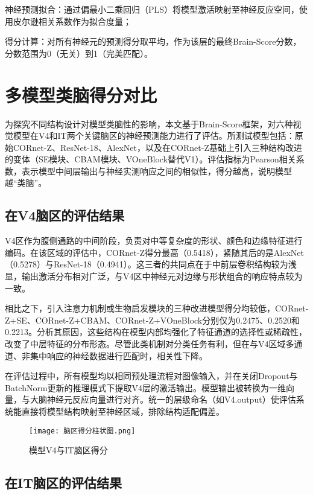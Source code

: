 神经预测拟合：通过偏最小二乘回归（PLS）将模型激活映射至神经反应空间，使用皮尔逊相关系数作为拟合度量；

得分计算：对所有神经元的预测得分取平均，作为该层的最终Brain-Score分数，分数范围为0（无关）到1（完美匹配）。

\section{多模型类脑得分对比}

为探究不同结构设计对模型类脑性的影响，本文基于Brain-Score框架，对六种视觉模型在V4和IT两个关键脑区的神经预测能力进行了评估。所测试模型包括：原始CORnet-Z、ResNet-18、AlexNet，以及在CORnet-Z基础上引入三种结构改进的变体（SE模块、CBAM模块、VOneBlock替代V1）。评估指标为Pearson相关系数，表示模型中间层输出与神经实测响应之间的相似性，得分越高，说明模型越“类脑”。

\subsection{在V4脑区的评估结果}

V4区作为腹侧通路的中间阶段，负责对中等复杂度的形状、颜色和边缘特征进行编码。在该区域的评估中，CORnet-Z得分最高（0.5418），紧随其后的是AlexNet（0.5278）与ResNet-18（0.4941）。这三者的共同点在于中前层卷积结构较为浅显，输出激活分布相对广泛，与V4区中神经元对边缘与形状组合的响应特点较为一致。

相比之下，引入注意力机制或生物启发模块的三种改进模型得分均较低，CORnet-Z+SE、CORnet-Z+CBAM、CORnet-Z+VOneBlock分别仅为0.2475、0.2520和0.2213。分析其原因，这些结构在模型内部均强化了特征通道的选择性或稀疏性，改变了中层特征的分布形态。尽管此类机制对分类任务有利，但在与V4区域多通道、非集中响应的神经数据进行匹配时，相关性下降。

在评估过程中，所有模型均以相同预处理流程对图像输入，并在关闭Dropout与BatchNorm更新的推理模式下提取V4层的激活输出。模型输出被转换为一维向量，与大脑神经元反应向量进行对齐。统一的层级命名（如V4.output）使评估系统能直接将模型结构映射至神经区域，排除结构适配偏差。

\begin{figure}[hbt]
	\centering
	\texttt{[image: 脑区得分柱状图.png]}
	\caption{模型V4与IT脑区得分}
	\label{f.脑区得分柱状图}
\end{figure}

\subsection{在IT脑区的评估结果}

